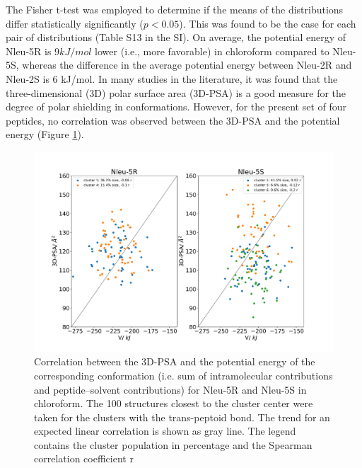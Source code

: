 The Fisher t-test \cite{Kotz1998} was employed to determine if the means of the distributions differ statistically significantly ($p < 0.05$). 
This was found to be the case for each pair of distributions (Table S13 in the SI). 
On average, the potential energy of Nleu-5R is $9 kJ/mol$ lower (i.e., more favorable) in chloroform compared to Nleu-5S, whereas the difference in the average potential energy between Nleu-2R and Nleu-2S is 6 kJ/mol. In many studies in the literature, it was found that the three-dimensional (3D) polar surface area (3D-PSA) is a good measure for the degree of polar shielding in conformations. \cite{Roux2020, Sebastiano2018, Vorherr2018, Peraro2018} 
However, for the present set of four peptides, no correlation was observed between the 3D-PSA and the potential energy (Figure \ref{fig: SI3DPSAANA}). 
\begin{figure}
    \centering
    \includegraphics[width=\textwidth]{7_chapter_5/fig/results/3dPSA.png}
    \caption{Correlation between the 3D-PSA and the potential energy of the corresponding conformation (i.e. sum of intramolecular contributions and peptide–solvent 
        contributions) for Nleu-5R and Nleu-5S in chloroform. The 100 structures closest to the cluster  center  were  taken  for  the  clusters  with  the  trans-peptoid  bond.  The  trend  for  an expected  linear  correlation  is  shown  as  gray  line.  The  legend  contains  the  cluster population in percentage and the Spearman correlation coefficient r}
    \label{fig: SI3DPSAANA}
\end{figure}


